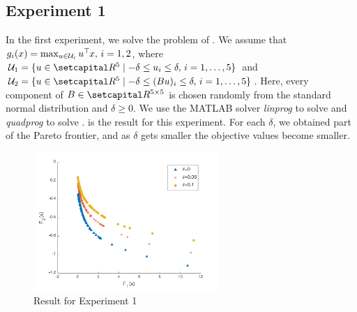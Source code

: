 \documentclass[../main]{subfiles}
\begin{document}
\subsection*{Experiment 1}
In the first experiment, we solve the problem of . We assume that $g_i(x) = \max_{u \in \mathcal{U}_i } u^\top\hspace{-1pt} x,\, i = 1,2$, where $\mathcal{U}_1 = \{u \in \setR^5\mid -\delta \leq u_i \leq \delta,\, i = 1,\dots,5 \}$ and $\mathcal{U}_2 = \{u \in \setR^5\mid -\delta \leq (Bu)_i \leq \delta,\, i = 1,\dots,5 \}$. Here, every component of $B \in \setR^{5 \times 5}$ is chosen randomly from the standard normal distribution and $\delta \geq 0$. We use the MATLAB solver \emph{linprog} to solve  and \emph{quadprog} to solve .  is the result for this experiment. For each $\delta$, we obtained part of the Pareto frontier, and as $\delta$ gets smaller the objective values become smaller.
\begin{figure}[htbp]
\centering
\includegraphics[clip, width = 7.0cm]{figs/linear_polyhedron_without_line_search}
\caption{Result for Experiment 1}
\end{figure}
\end{document}

